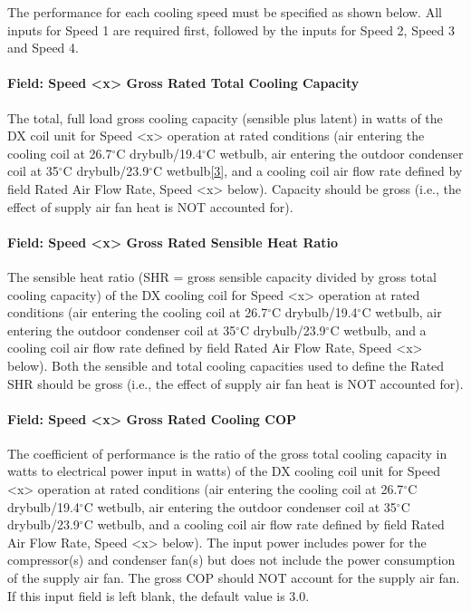 The performance for each cooling speed must be specified as shown below. All inputs for Speed 1 are required first, followed by the inputs for Speed 2, Speed 3 and Speed 4.

\paragraph{Field: Speed \textless{}x\textgreater{} Gross Rated Total Cooling Capacity}\label{field-speed-x-gross-rated-total-cooling-capacity}

The total, full load gross cooling capacity (sensible plus latent) in watts of the DX coil unit for Speed \textless{}x\textgreater{} operation at rated conditions (air entering the cooling coil at 26.7$^\circ$C drybulb/19.4$^\circ$C wetbulb, air entering the outdoor condenser coil at 35$^\circ$C drybulb/23.9$^\circ$C wetbulb\protect\hyperlink{ux5fftn3}{{[}3{]}}, and a cooling coil air flow rate defined by field Rated Air Flow Rate, Speed \textless{}x\textgreater{} below). Capacity should be gross (i.e., the effect of supply air fan heat is NOT accounted for).

\paragraph{Field: Speed \textless{}x\textgreater{} Gross Rated Sensible Heat Ratio}\label{field-speed-x-gross-rated-sensible-heat-ratio}

The sensible heat ratio (SHR = gross sensible capacity divided by gross total cooling capacity) of the DX cooling coil for Speed \textless{}x\textgreater{} operation at rated conditions (air entering the cooling coil at 26.7$^\circ$C drybulb/19.4$^\circ$C wetbulb, air entering the outdoor condenser coil at 35$^\circ$C drybulb/23.9$^\circ$C wetbulb, and a cooling coil air flow rate defined by field Rated Air Flow Rate, Speed \textless{}x\textgreater{} below). Both the sensible and total cooling capacities used to define the Rated SHR should be gross (i.e., the effect of supply air fan heat is NOT accounted for).

\paragraph{Field: Speed \textless{}x\textgreater{} Gross Rated Cooling COP}\label{field-speed-x-gross-rated-cooling-cop}

The coefficient of performance is the ratio of the gross total cooling capacity in watts to electrical power input in watts) of the DX cooling coil unit for Speed \textless{}x\textgreater{} operation at rated conditions (air entering the cooling coil at 26.7$^\circ$C drybulb/19.4$^\circ$C wetbulb, air entering the outdoor condenser coil at 35$^\circ$C drybulb/23.9$^\circ$C wetbulb, and a cooling coil air flow rate defined by field Rated Air Flow Rate, Speed \textless{}x\textgreater{} below). The input power includes power for the compressor(s) and condenser fan(s) but does not include the power consumption of the supply air fan. The gross COP should NOT account for the supply air fan. If this input field is left blank, the default value is 3.0.

